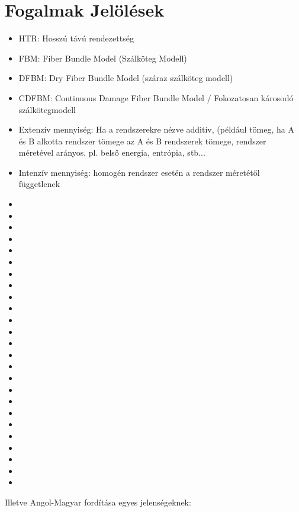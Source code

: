 \chapter*{Fogalmak Jelölések}
\label{chapt:fog}

\begin{itemize}
\item HTR: Hosszú távú rendezettség
\item FBM: Fiber Bundle Model (Szálköteg Modell)
\item DFBM: Dry Fiber Bundle Model (száraz szálköteg modell)
\item CDFBM: Continuous Damage Fiber Bundle Model / Fokozatosan károsodó szálkötegmodell
\item Extenzív mennyiség: Ha a rendszerekre nézve additív, (például tömeg, ha A és B alkotta rendszer tömege az A és B rendszerek tömege, rendszer méretével arányos, pl. belső energia, entrópia, stb...
\item Intenzív mennyiség: homogén rendszer esetén a rendszer méretétől függetlenek
\item
\item
\item
\item
\item
\item
\item
\item
\item
\item
\item
\item
\item
\item
\item
\item
\item
\item
\item
\item
\item
\item
\item
\item
\item

\end{itemize}

Illetve Angol-Magyar fordítása egyes jelenségeknek:

